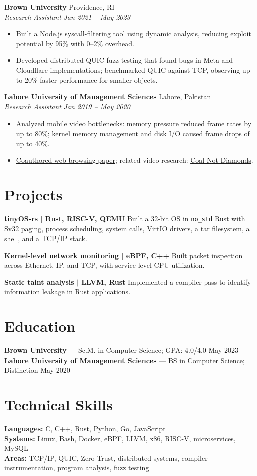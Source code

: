\documentclass[letterpaper,10pt]{article}
\newcommand{\role}[4]{\textbf{#1} \hfill #2\\\textit{#3} \hfill \textit{#4}\par}
\newcommand{\project}[2]{\textbf{#1} #2\par\vspace{2pt}}
\begin{document}
\vspace{2pt}
\role{Brown University}{Providence, RI}{Research Assistant}{Jan 2021 -- May 2023}
\begin{itemize}
\item Built a Node.js syscall-filtering tool using dynamic analysis, reducing exploit potential by 95\% with 0--2\% overhead.
\item Developed distributed QUIC fuzz testing that found bugs in Meta and Cloudflare implementations; benchmarked QUIC against TCP, observing up to 20\% faster performance for smaller objects.
\end{itemize}
\vspace{2pt}
\role{Lahore University of Management Sciences}{Lahore, Pakistan}{Research Assistant}{Jan 2019 -- May 2020}
\begin{itemize}
\item Analyzed mobile video bottlenecks: memory pressure reduced frame rates by up to 80\%; kernel memory management and disk I/O caused frame drops of up to 40\%.
\item \href{https://cs.brown.edu/people/tab/papers/CCR20.pdf}{\underline{Coauthored web-browsing paper}}; related video research: \href{https://talha.cs.illinois.edu/files/coal-not-diamonds.pdf}{\underline{Coal Not Diamonds}}.
\end{itemize}
\section{Projects}
\project{tinyOS-rs $|$ Rust, RISC-V, QEMU}{Built a 32-bit OS in \texttt{no\_std} Rust with Sv32 paging, process scheduling, system calls, VirtIO drivers, a tar filesystem, a shell, and a TCP/IP stack.}
\project{Kernel-level network monitoring $|$ eBPF, C++}{Built packet inspection across Ethernet, IP, and TCP, with service-level CPU utilization.}
\project{Static taint analysis $|$ LLVM, Rust}{Implemented a compiler pass to identify information leakage in Rust applications.}
\section{Education}
\textbf{Brown University} --- Sc.M. in Computer Science; GPA: 4.0/4.0 \hfill May 2023\\
\textbf{Lahore University of Management Sciences} --- BS in Computer Science; Distinction \hfill May 2020
\section{Technical Skills}
\textbf{Languages:} C, C++, Rust, Python, Go, JavaScript\\
\textbf{Systems:} Linux, Bash, Docker, eBPF, LLVM, x86, RISC-V, microservices, MySQL\\
\textbf{Areas:} TCP/IP, QUIC, Zero Trust, distributed systems, compiler instrumentation, program analysis, fuzz testing
\end{document}
